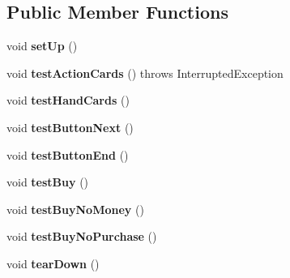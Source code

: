 \subsection*{\-Public \-Member \-Functions}
\begin{DoxyCompactItemize}
\item 
\hypertarget{classdominion_1_1view_1_1GameScreenTest_a85bb3b537299abe7feb5dd56398cd28c}{void {\bfseries set\-Up} ()}\label{classdominion_1_1view_1_1GameScreenTest_a85bb3b537299abe7feb5dd56398cd28c}

\item 
\hypertarget{classdominion_1_1view_1_1GameScreenTest_a3bb82d6e4df20af4123d0633c1b7cbbf}{void {\bfseries test\-Action\-Cards} ()  throws Interrupted\-Exception }\label{classdominion_1_1view_1_1GameScreenTest_a3bb82d6e4df20af4123d0633c1b7cbbf}

\item 
\hypertarget{classdominion_1_1view_1_1GameScreenTest_acaf0a2de1fe1663ce682aab23e8b74d6}{void {\bfseries test\-Hand\-Cards} ()}\label{classdominion_1_1view_1_1GameScreenTest_acaf0a2de1fe1663ce682aab23e8b74d6}

\item 
\hypertarget{classdominion_1_1view_1_1GameScreenTest_a7c871e273894303387576458ad471450}{void {\bfseries test\-Button\-Next} ()}\label{classdominion_1_1view_1_1GameScreenTest_a7c871e273894303387576458ad471450}

\item 
\hypertarget{classdominion_1_1view_1_1GameScreenTest_a6afe5bdca775810976df3e9cbedd099e}{void {\bfseries test\-Button\-End} ()}\label{classdominion_1_1view_1_1GameScreenTest_a6afe5bdca775810976df3e9cbedd099e}

\item 
\hypertarget{classdominion_1_1view_1_1GameScreenTest_ac371116014335d7a3df7514b9ba1ca06}{void {\bfseries test\-Buy} ()}\label{classdominion_1_1view_1_1GameScreenTest_ac371116014335d7a3df7514b9ba1ca06}

\item 
\hypertarget{classdominion_1_1view_1_1GameScreenTest_a2e2dc2589bf1ba11a2b1344568aa9f78}{void {\bfseries test\-Buy\-No\-Money} ()}\label{classdominion_1_1view_1_1GameScreenTest_a2e2dc2589bf1ba11a2b1344568aa9f78}

\item 
\hypertarget{classdominion_1_1view_1_1GameScreenTest_aec6d56b6c32f4dd5c146b2420d2a5c1c}{void {\bfseries test\-Buy\-No\-Purchase} ()}\label{classdominion_1_1view_1_1GameScreenTest_aec6d56b6c32f4dd5c146b2420d2a5c1c}

\item 
\hypertarget{classdominion_1_1view_1_1GameScreenTest_a9805c1dc3b3f721c4300ba3fef27a574}{void {\bfseries tear\-Down} ()}\label{classdominion_1_1view_1_1GameScreenTest_a9805c1dc3b3f721c4300ba3fef27a574}

\end{DoxyCompactItemize}


